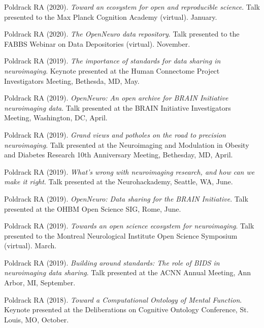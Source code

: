 \documentclass[10pt, letterpaper]{article}
\begin{document}
Poldrack RA (2020). \emph{Toward an ecosystem for open and reproducible science}. Talk presented to the Max Planck Cognition Academy (virtual).  January. \vspace{2mm}

Poldrack RA (2020). \emph{The OpenNeuro data repository}. Talk presented to the FABBS Webinar on Data Depositories (virtual). November. \vspace{2mm}

Poldrack RA (2019). \emph{The importance of standards for data sharing in neuroimaging}. Keynote presented at the Human Connectome Project Investigators Meeting, Bethesda, MD, May. \vspace{2mm}

Poldrack RA (2019). \emph{OpenNeuro: An open archive for BRAIN Initiative neuroimaging data}. Talk presented at the BRAIN Initiative Investigators Meeting, Washington, DC, April. \vspace{2mm}

Poldrack RA (2019). \emph{Grand views and potholes on the road to precision neuroimaging}. Talk presented at the Neuroimaging and Modulation in Obesity and Diabetes Research 10th Anniversary Meeting, Bethesday, MD, April. \vspace{2mm}

Poldrack RA (2019). \emph{What's wrong with neuroimaging research, and how can we make it right}. Talk presented at the Neurohackademy, Seattle, WA, June. \vspace{2mm}

Poldrack RA (2019). \emph{OpenNeuro: Data sharing for the BRAIN Initiative}. Talk presented at the OHBM Open Science SIG, Rome, June. \vspace{2mm}

Poldrack RA (2019). \emph{Towards an open science ecosystem for neuroimaging}. Talk presented to the Montreal Neurological Institute Open Science Symposium (virtual).  March. \vspace{2mm}

Poldrack RA (2019). \emph{Building around standards: The role of BIDS in neuroimaging data sharing}. Talk presented at the ACNN Annual Meeting, Ann Arbor, MI, September. \vspace{2mm}

Poldrack RA (2018). \emph{Toward a Computational Ontology of Mental Function}. Keynote presented at the Deliberations on Cognitive Ontology Conference, St. Louis, MO, October. \vspace{2mm}
\end{document}
